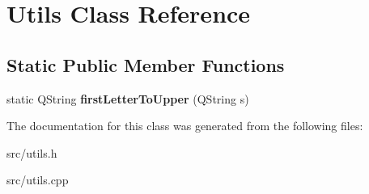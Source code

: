 \hypertarget{classUtils}{\section{Utils Class Reference}
\label{classUtils}
}
\subsection*{Static Public Member Functions}
\begin{DoxyCompactItemize}
\item 
\hypertarget{classUtils_a009b2a8ef00831aff87d2e46ca209398}{static Q\+String {\bfseries first\+Letter\+To\+Upper} (Q\+String s)}\label{classUtils_a009b2a8ef00831aff87d2e46ca209398}

\end{DoxyCompactItemize}


The documentation for this class was generated from the following files\+:\begin{DoxyCompactItemize}
\item 
src/utils.\+h\item 
src/utils.\+cpp\end{DoxyCompactItemize}
